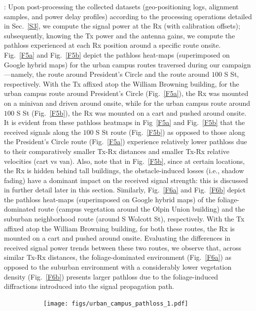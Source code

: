 \documentclass[12pt, draftcls, onecolumn]{IEEEtran}
\begin{document}
{: Upon post-processing the collected datasets (geo-positioning logs, alignment samples, and power delay profiles) according to the processing operations detailed in Sec.~\ref{S3}, we compute the signal power at the Rx (with calibration offsets); subsequently, knowing the Tx power and the antenna gains, we compute the pathloss experienced at each Rx position around a specific route onsite. Fig.~\ref{F5a} and Fig.~\ref{F5b} depict the pathloss heat-maps (superimposed on Google hybrid maps) for the urban campus routes traversed during our campaign---namely, the route around President's Circle and the route around $100$ S St, respectively. With the Tx affixed atop the William Browning building, for the urban campus route around President's Circle (Fig.~\ref{F5a}), the Rx was mounted on a minivan and driven around onsite, while for the urban campus route around $100$ S St (Fig.~\ref{F5b}), the Rx was mounted on a cart and pushed around onsite. It is evident from these pathloss heatmaps in Fig~\ref{F5a} and Fig.~\ref{F5b} that the received signals along the $100$ S St route (Fig.~\ref{F5b}) as opposed to those along the President's Circle route (Fig.~\ref{F5a}) experience relatively lower pathloss due to their comparatively smaller Tx-Rx distances and smaller Tx-Rx relative velocities (cart vs van). Also, note that in Fig.~\ref{F5b}, since at certain locations, the Rx is hidden behind tall buildings, the obstacle-induced losses (i.e., shadow fading) have a dominant impact on the received signal strength: this is discussed in further detail later in this section. Similarly, Fig.~\ref{F6a} and Fig.~\ref{F6b} depict the pathloss heat-maps (superimposed on Google hybrid maps) of the foliage-dominated route (campus vegetation around the Olpin Union building) and the suburban neighborhood route (around S Wolcott St), respectively. With the Tx affixed atop the William Browning building, for both these routes, the Rx is mounted on a cart and pushed around onsite. Evaluating the differences in received signal power trends between these two routes, we observe that, across similar Tx-Rx distances, the foliage-dominated environment (Fig.~\ref{F6a}) as opposed to the suburban environment with a considerably lower vegetation density (Fig.~\ref{F6b}) presents larger pathloss due to the foliage-induced diffractions introduced into the signal propagation path.
\begin{figure} [t]
    \centering
    \begin{subfigure}{0.564\linewidth}
        \centering
        \texttt{[image: figs/urban\_campus\_pathloss\_1.pdf]}

\end{subfigure}
\end{figure}}
\end{document}
